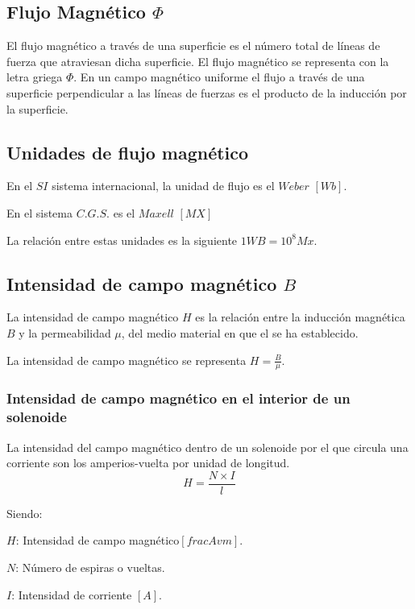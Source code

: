 \documentclass[../main]{subfiles}
\begin{document}
\subsection{Flujo Magnético $\Phi$}

El flujo magnético a través de una superficie es el número total de líneas de fuerza que atraviesan dicha superficie.
El flujo magnético se representa con la letra griega $\Phi$.
En un campo magnético uniforme el flujo a través de una superficie perpendicular a las líneas de fuerzas es el producto de la inducción por la superficie.

\subsection {Unidades de flujo magnético}

En el $SI$ sistema internacional, la unidad de flujo es el $Weber$ $[Wb]$.

En el sistema $C.G.S.$ es el $Maxell$ $[MX]$

La relación entre estas unidades es la siguiente $1WB = 10^8Mx$.

\subsection{Intensidad de campo magnético $B$}

La intensidad de campo magnético $H$ es la relación entre la inducción magnética $B$ y la permeabilidad $\mu$, del medio material en que el se ha establecido.

La intensidad de campo magnético se representa $H= \frac{B}{\mu}$.

\subsubsection{Intensidad de campo magnético en el interior de un solenoide}

La intensidad del campo magnético dentro de un solenoide por el que circula una corriente son los amperios-vuelta por unidad de longitud.
\begin{equation*}
    H=\frac{N \times I}{l}
\end{equation*}

Siendo:

$H$: Intensidad de campo magnético$ [frac{Av}{m}]$.

$N$: Número de espiras o vueltas.

$I$: Intensidad de corriente $[A]$.
\end{document}
